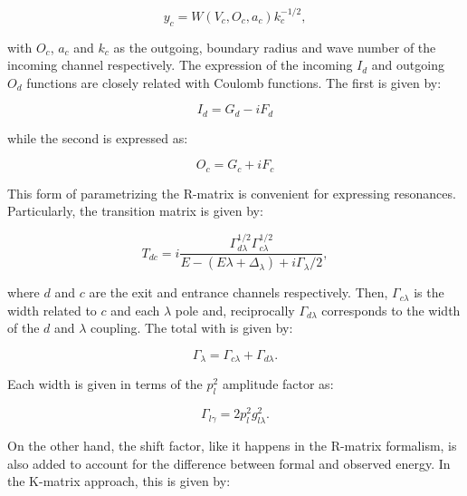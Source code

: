 \documentclass[openany]{book}
\begin{document}
\begin{equation}\label{eq:rmatrix_kmatrix_Smatrix_y}
	y_c = W(V_c, O_c, a_c) k^{-1/2}_c,
\end{equation}

with $O_c$, $a_c$ and $k_c$ as the outgoing, boundary radius and wave number of the incoming channel respectively. The expression of the incoming $I_d$ and outgoing $O_d$ functions are closely related with Coulomb functions. The first is given by:

\begin{equation}\label{eq:rmatrix_kmatrix_Smatrix_ingoing}
	I_d = G_d - i F_d
\end{equation}

while the second is expressed as:

\begin{equation}\label{eq:rmatrix_kmatrix_Smatrix_outgoing}
	O_c = G_c + iF_c
\end{equation}


This form of parametrizing the R-matrix is convenient for expressing resonances. Particularly, the transition matrix is given by:

\begin{equation}\label{eq:rmatrix_kmatrix_transitionMatrix}
	T_{dc} = i \frac{\Gamma^{1/2}_{d\lambda} \Gamma^{1/2}_{c\lambda} }{E - (E\lambda + \Delta_\lambda) + i \Gamma_\lambda/2},
\end{equation}

where $d$ and $c$ are the exit and entrance channels respectively. Then, $\Gamma_{c\lambda}$ is the width related to $c$ and each $\lambda$ pole and, reciprocally $\Gamma_{d\lambda}$ corresponds to the width of the $d$ and $\lambda$ coupling. The total with is given by:

\begin{equation}\label{eq:rmatrix_kmatrix_totalWidth}
	\Gamma_\lambda = \Gamma_{c\lambda} + \Gamma_{d\lambda}.
\end{equation}

Each width is given in terms of the $p^2_l$ amplitude factor as:

\begin{equation}\label{eq:rmatrix_kmatrix_witdh}
	\Gamma_{l\gamma} = 2p^2_l g^2_{l\lambda}.
\end{equation}

On the other hand, the shift factor, like it happens in the R-matrix formalism, is also added to account for the difference between formal and observed energy. In the K-matrix approach, this is given by:
\end{document}
